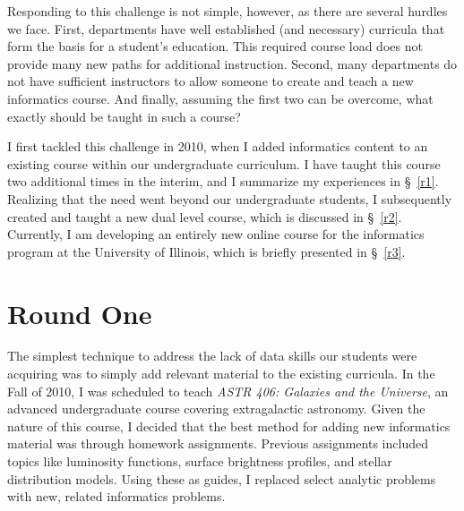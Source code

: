 Responding to this challenge is not simple, however, as there are several hurdles we face. First, departments have well established (and necessary) curricula that form the basis for a student's education. This required course load does not provide many new paths for additional instruction. Second, many departments do not have sufficient instructors to allow someone to create and teach a new informatics course. And finally, assuming the first two can be overcome, what exactly should be taught in such a course?

I first tackled this challenge in 2010, when I added informatics content to an existing course within our undergraduate curriculum. I have taught this course two additional times in the interim, and I summarize my experiences in \S~\ref{r1}. Realizing that the need went beyond our undergraduate students, I subsequently created and taught a new dual level course, which is discussed in \S~\ref{r2}. Currently, I am developing an entirely new online course for the informatics program at the University of Illinois, which is briefly presented in \S~\ref{r3}.

\section{Round One~\label{r1}}

The simplest technique to address the lack of data skills our students were acquiring was to simply add relevant material to the existing curricula. In the Fall of 2010,  I was scheduled to teach \textit{ASTR 406: Galaxies and the Universe}, an advanced undergraduate course covering extragalactic astronomy. Given the nature of this course, I decided that the best method for adding new informatics material was through homework assignments. Previous assignments included topics like luminosity functions, surface brightness profiles, and stellar distribution models. Using these as guides, I replaced select analytic problems with new, related informatics problems.


